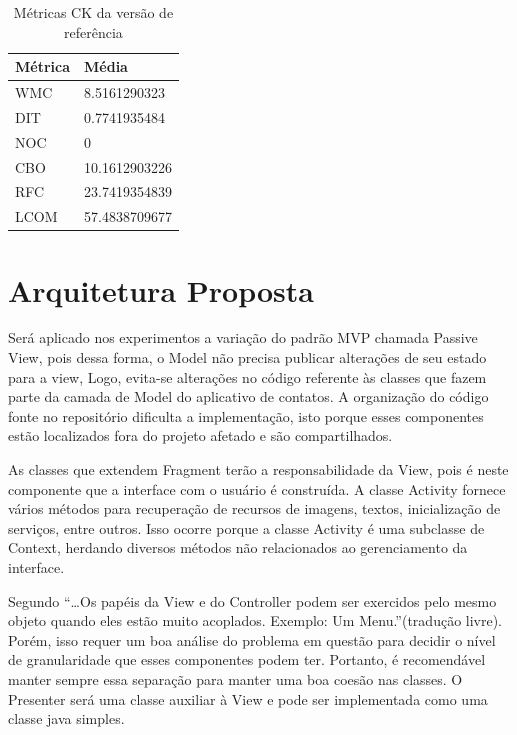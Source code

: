 \begin{table}[!h]
	\centering
	    \caption{Métricas CK da versão de referência}
	
    \begin{tabular}{ | l | l | }
    \hline
    Métrica &	Média \\ \hline
    WMC  	&	8.5161290323   	\\ \hline
    DIT	 	&	0.7741935484	\\ \hline
	NOC  	& 	0				\\ \hline
	CBO	  	& 	10.1612903226	\\ \hline
	RFC	 	& 	23.7419354839	\\ \hline
	LCOM 	& 	57.4838709677	\\ \hline
    \end{tabular}
    \label{tab:dados_baseline}
\end{table}


\section{Arquitetura Proposta}

Será aplicado nos experimentos a variação do padrão MVP chamada Passive View,
pois dessa forma, o Model não precisa publicar alterações de seu estado para a
view, Logo, evita-se alterações no código referente às classes que fazem
parte da camada de Model do aplicativo de contatos. A organização do código
fonte no repositório dificulta a implementação, isto porque esses componentes estão
localizados fora do projeto afetado e são compartilhados.

As classes que extendem Fragment terão a responsabilidade da View, pois é neste
componente que a interface com o usuário é construída. A classe Activity fornece
vários métodos para recuperação de recursos de imagens, textos, inicialização de
serviços, entre outros. Isso ocorre porque a classe Activity é uma subclasse de Context, herdando diversos métodos não relacionados ao gerenciamento da interface.

Segundo  ``\ldots Os papéis da View e do
Controller podem ser exercidos pelo mesmo objeto quando eles estão muito
acoplados. Exemplo: Um Menu.''(tradução livre). Porém, isso requer um boa
análise do problema em questão para decidir o nível de granularidade que esses componentes podem ter.
Portanto, é recomendável manter sempre essa separação para manter uma boa coesão
nas classes. O Presenter será uma classe auxiliar à View e pode ser implementada
como uma classe java simples. 



